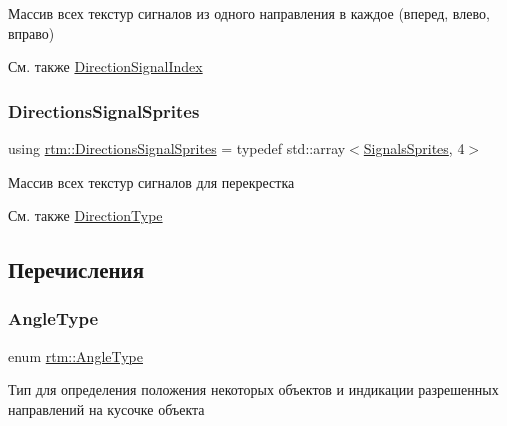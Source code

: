 Массив всех текстур сигналов из одного направления в каждое (вперед, влево, вправо) \begin{DoxySeeAlso}{См. также}
\hyperlink{namespacertm_a27eb93235356cdffe25fe6628e7eff14}{Direction\+Signal\+Index} 
\end{DoxySeeAlso}
\mbox{\label{namespacertm_ac9f276c8ed33ee992eb1a1f04a8254a0}} 
\subsubsection{\texorpdfstring{Directions\+Signal\+Sprites}{DirectionsSignalSprites}}
{\footnotesize\ttfamily using \hyperlink{namespacertm_ac9f276c8ed33ee992eb1a1f04a8254a0}{rtm\+::\+Directions\+Signal\+Sprites} = typedef std\+::array$<$\hyperlink{namespacertm_a260109b3376dc38095724ee80ed72d8e}{Signals\+Sprites}, 4$>$}

Массив всех текстур сигналов для перекрестка \begin{DoxySeeAlso}{См. также}
\hyperlink{namespacertm_a57b216f3aeb45041f3461bab08bc3aeb}{Direction\+Type} 
\end{DoxySeeAlso}


\subsection{Перечисления}
\mbox{\label{namespacertm_a69dc82b16a0148c10962caa83d930f89}} 
\subsubsection{\texorpdfstring{Angle\+Type}{AngleType}}
{\footnotesize\ttfamily enum \hyperlink{namespacertm_a69dc82b16a0148c10962caa83d930f89}{rtm\+::\+Angle\+Type}}



Тип для определения положения некоторых объектов и индикации разрешенных направлений на кусочке объекта 

